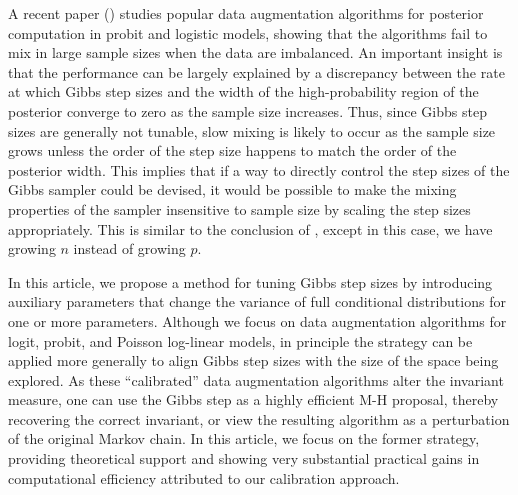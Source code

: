 \documentclass[10pt]{article}
\begin{document}
A recent paper (\cite{johndrow2016inefficiency}) studies popular data augmentation algorithms for posterior computation in probit \citep{albert1993bayesian} and logistic  \citep{polson2013bayesian} models, showing that the algorithms fail to mix in large sample sizes when the data are imbalanced. An important insight is that the performance can be largely explained by a discrepancy between the rate at which Gibbs step sizes and the width of the high-probability region of the posterior converge to zero as the sample size increases. Thus, since Gibbs step sizes are generally not tunable, slow mixing is likely to occur as the sample size grows unless the order of the step size happens to match the order of the posterior width. This implies that if a way to directly control the step sizes of the Gibbs sampler could be devised, it would be possible to make the mixing properties of the sampler insensitive to sample size by scaling the step sizes appropriately. This is similar to the conclusion of \cite{hairer2014spectral}, except in this case, we have growing $n$ instead of growing $p$.

In this article, we propose a method for tuning Gibbs step sizes by introducing auxiliary parameters that change the variance of full conditional distributions for one or more parameters. Although we focus on data augmentation algorithms for logit, probit, and Poisson log-linear models, in principle the strategy can be applied more generally to align Gibbs step sizes with the size of the space being explored. As these ``calibrated'' data augmentation algorithms alter the invariant measure, one can use the Gibbs step as a highly efficient M-H proposal, thereby recovering the correct invariant, or view the resulting algorithm as a perturbation of the original Markov chain.  In this article, we focus on the former strategy, providing theoretical support and showing very substantial practical gains in computational efficiency attributed to our calibration approach.
\end{document}
